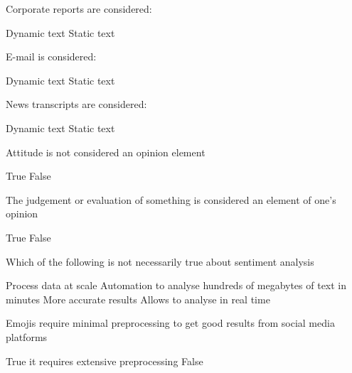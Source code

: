 \documentclass[theme=sleek, randomorder, hidesidemenu]{webquiz}
\begin{document}
\begin{question}
  Corporate reports are considered:
  \begin{choice}
    \incorrect Dynamic text
    \correct Static text
  \end{choice}
\end{question}

\begin{question}
  E-mail is considered:
  \begin{choice}
    \incorrect Dynamic text
    \correct Static text
  \end{choice}

\end{question}

\begin{question}
  News transcripts are considered:
  \begin{choice}
    \incorrect Dynamic text
    \correct Static text
  \end{choice}
\end{question}

\begin{question}
  Attitude is not considered an opinion element
  \begin{choice}
    \incorrect True
    \correct False
  \end{choice}
\end{question}

\begin{question}
  The judgement or evaluation of something is considered an element of one's opinion
  \begin{choice}
    \correct True
    \incorrect False
  \end{choice}
\end{question}

\begin{question}
  Which of the following is not necessarily true about sentiment analysis
  \begin{choice}
    \incorrect Process data at scale
    \incorrect Automation to analyse hundreds of megabytes of text in minutes
    \correct More accurate results
    \incorrect Allows to analyse in real time
  \end{choice}
\end{question}

\begin{question}
  Emojis require minimal preprocessing to get good results from social media platforms
  \begin{choice}
    \incorrect True \feedback it requires extensive preprocessing
    \correct False
  \end{choice}
\end{question}
\end{document}
